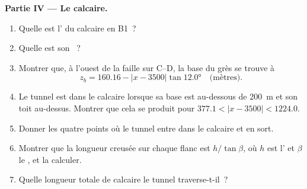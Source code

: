 \begin{problem}
\medskip
\noindent\textbf{Partie IV --- Le calcaire.}
\begin{enumerate}[resume]
  \item Quelle est l' du calcaire en B1~?
  \item Quelle est son ~?
  \item Montrer que, à l'ouest de la faille sur C--D, la base du grès se trouve
        à
        \[ z_b = 160.16 - |x - 3500|\tan\ang{12.0} \quad\text{(mètres)}. \]
  \item Le tunnel est dans le calcaire lorsque sa base est au-dessous de
        \qty{200}{m} et son toit au-dessus. Montrer que cela se produit pour
        $377.1 < |x - 3500|
        < 1224.0$.
  \item Donner les quatre points où le tunnel entre dans le calcaire et en sort.
  \item Montrer que la longueur creusée sur chaque flanc est $h/\tan\beta$, où
        $h$ est l' et $\beta$ le , et la
        calculer.
  \item Quelle longueur totale de calcaire le tunnel traverse-t-il~?
\end{enumerate}
\end{problem}
